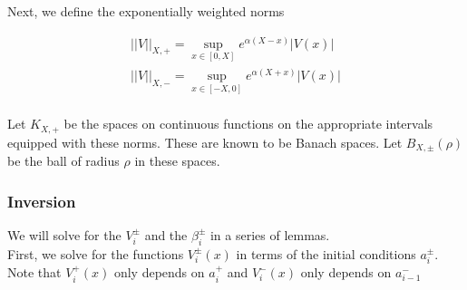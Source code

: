 \documentclass[12pt]{article}
\begin{document}
Next, we define the exponentially weighted norms

\begin{align*}
||V||_{X, +} = \sup_{x \in [0, X]} e^{\alpha(X - x)}|V(x)| \\
||V||_{X, -} = \sup_{x \in [-X, 0]} e^{\alpha(X + x)}|V(x)| \\
\end{align*}

Let $K_{X, +}$ be the spaces on continuous functions on the appropriate intervals equipped with these norms. These are known to be Banach spaces. Let $B_{X, \pm}(\rho)$ be the ball of radius $\rho$ in these spaces.\\

\subsubsection{Inversion}

We will solve for the $V_i^\pm$ and the $\beta_i^\pm$ in a series of lemmas.\\

First, we solve for the functions $V_i^\pm(x)$ in terms of the initial conditions $a_i^\pm$. Note that $V_i^+(x)$ only depends on $a_i^+$ and $V_i^-(x)$ only depends on $a_{i-1}^-$

\end{document}

